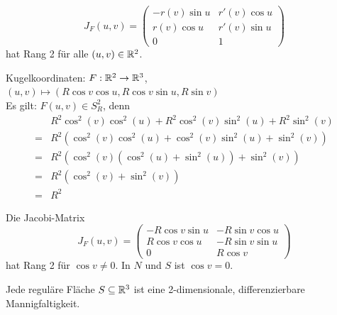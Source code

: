 \begin{beispiel}
\begin{bspenum}
            \[J_F(u,v) = 
            \begin{pmatrix}
                -r(v) \sin u & r'(v) \cos u\\
                r(v) \cos u  & r'(v) \sin u\\
                 0           & 1
            \end{pmatrix}\]
            hat Rang 2 für alle $(u,v) \in \mathbb{R}^2$.
        \item Kugelkoordinaten: $F: \mathbb{R}^2 \rightarrow \mathbb{R}^3$,\\
              $(u, v) \mapsto (R \cos v \cos u, R \cos v \sin u, R \sin v)$\\
              Es gilt: $F(u,v) \in S_R^2$, denn 
                \begin{align*}
                    & R^2 \cos^2(v) \cos^2(u) + R^2 \cos^2(v) \sin^2(u) + R^2 \sin^2(v)\\
                    =& R^2 (\cos^2(v) \cos^2(u) + \cos^2(v) \sin^2(u) + \sin^2(v))\\
                    =& R^2 \left (\cos^2(v) (\cos^2(u) + \sin^2(u)) + \sin^2(v) \right)\\
                    =& R^2 \left (\cos^2(v) + \sin^2(v) \right)\\
                    =&R^2
                \end{align*}

                Die Jacobi-Matrix
                \[J_F(u,v) = 
                \begin{pmatrix}
                    -R \cos v \sin u & -R \sin v \cos u\\
                    R \cos v \cos u  & -R \sin v \sin u\\
                    0                & R \cos v
                \end{pmatrix}\]
                hat Rang 2 für $\cos v \neq 0$. In $N$ und $S$ ist
                $\cos v = 0$.
    \end{bspenum}
\end{beispiel}

\begin{bemerkung}\label{kor:regular-surface-mannigfaltigkeit}
    Jede reguläre Fläche $S \subseteq \mathbb{R}^3$ ist eine 2-dimensionale,
    differenzierbare Mannigfaltigkeit.
\end{bemerkung}

